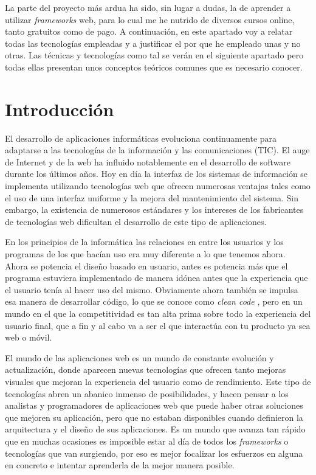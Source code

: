 
La parte del proyecto más ardua ha sido, sin lugar a dudas, la de aprender a utilizar \emph{frameworks}  web, para lo cual me he nutrido de diversos cursos online, tanto gratuitos como de pago. A continuación, en este apartado voy a relatar todas las tecnologías empleadas y a justificar el por que he empleado unas y no otras. Las técnicas y tecnologías como tal se verán en el siguiente apartado pero todas ellas presentan unos conceptos teóricos comunes que es necesario conocer. 


\section{Introducción}\label{teorico-introduccion}
El desarrollo de aplicaciones informáticas evoluciona continuamente para adaptarse a las tecnologías de la información y las comunicaciones (TIC). El auge de Internet y de la web ha influido notablemente en el desarrollo de software durante los últimos años. Hoy en día la interfaz de los sistemas de información se implementa utilizando tecnologías web que ofrecen numerosas ventajas tales como el uso de una interfaz uniforme y la mejora del mantenimiento del sistema. Sin embargo, la existencia de numerosos estándares y los intereses de los fabricantes de tecnologías web dificultan el desarrollo de este tipo de aplicaciones. 

En los principios de la informática las relaciones en entre los usuarios y los programas de los que hacían uso era muy diferente a lo que tenemos ahora. Ahora se potencia el diseño basado en usuario, antes es potencia más que el programa estuviera implementado de manera idónea antes que la experiencia que el usuario tenía al hacer uso del mismo. Obviamente ahora también se impulsa esa manera de desarrollar código, lo que se conoce como \emph{clean code} \cite{https://g.co/kgs/VLR4mn}, pero en un mundo en el que la competitividad es tan alta prima sobre todo la experiencia del usuario final, que a fin y al cabo va a ser el que interactúa con tu producto ya sea web o móvil. 




El mundo de las aplicaciones web es un mundo de constante evolución y actualización, donde aparecen nuevas tecnologías que ofrecen tanto mejoras visuales que mejoran la experiencia del usuario como de rendimiento. Este tipo de tecnologías abren un abanico inmenso de posibilidades, y hacen pensar a los analistas y programadores de aplicaciones web que puede haber otras soluciones que mejoren su aplicación, pero que no estaban disponibles cuando definieron la arquitectura y el diseño de sus aplicaciones. Es un mundo que avanza tan rápido que en muchas ocasiones es imposible estar al día de todos los  \emph{frameworks} o tecnologías que van surgiendo, por eso es mejor focalizar los esfuerzos en alguna en concreto e intentar aprenderla de la mejor manera posible. 




